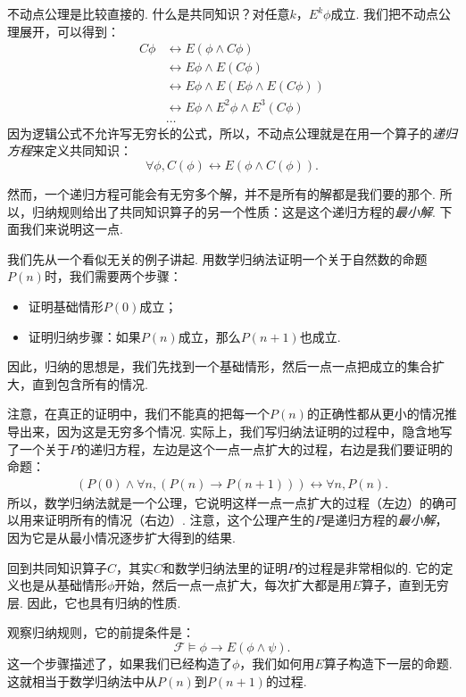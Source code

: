 不动点公理是比较直接的. 什么是共同知识？对任意$k$，$E^k\phi$成立. 我们把不动点公理展开，可以得到：
\begin{align*}
    C\phi&\leftrightarrow E(\phi\wedge C\phi)\\
    &\leftrightarrow E\phi\wedge E(C\phi)\\
    &\leftrightarrow E\phi\wedge E(E\phi\wedge E(C\phi))\\
    &\leftrightarrow E\phi\wedge E^2\phi\wedge E^3(C\phi)\\
    &\dots
\end{align*}
因为逻辑公式不允许写无穷长的公式，所以，不动点公理就是在用一个算子的\emph{递归方程}来定义共同知识：
\[\forall\phi,C(\phi)\leftrightarrow E(\phi\wedge C(\phi)). \]

然而，一个递归方程可能会有无穷多个解，并不是所有的解都是我们要的那个. 所以，归纳规则给出了共同知识算子的另一个性质：这是这个递归方程的\emph{最小解}. 下面我们来说明这一点. 

我们先从一个看似无关的例子讲起. 用数学归纳法证明一个关于自然数的命题$P(n)$时，我们需要两个步骤：
\begin{itemize}
    \item 证明基础情形$P(0)$成立；
    \item 证明归纳步骤：如果$P(n)$成立，那么$P(n+1)$也成立. 
\end{itemize}
因此，归纳的思想是，我们先找到一个基础情形，然后一点一点把成立的集合扩大，直到包含所有的情况. 

注意，在真正的证明中，我们不能真的把每一个$P(n)$的正确性都从更小的情况推导出来，因为这是无穷多个情况. 实际上，我们写归纳法证明的过程中，隐含地写了一个关于$P$的递归方程，左边是这个一点一点扩大的过程，右边是我们要证明的命题：
\begin{align*}
    (P(0)\wedge\forall n,(P(n)\to P(n+1)))\leftrightarrow\forall n,P(n).
\end{align*}
所以，数学归纳法就是一个公理，它说明这样一点一点扩大的过程（左边）的确可以用来证明所有的情况（右边）. 注意，这个公理产生的$P$是递归方程的\emph{最小解}，因为它是从最小情况逐步扩大得到的结果. 

回到共同知识算子$C$，其实$C$和数学归纳法里的证明$P$的过程是非常相似的. 它的定义也是从基础情形$\phi$开始，然后一点一点扩大，每次扩大都是用$E$算子，直到无穷层. 因此，它也具有归纳的性质. 

观察归纳规则，它的前提条件是：
\[\mathcal F\vDash \phi\to E(\phi\wedge\psi).\]
这一个步骤描述了，如果我们已经构造了$\phi$，我们如何用$E$算子构造下一层的命题. 这就相当于数学归纳法中从$P(n)$到$P(n+1)$的过程. 

